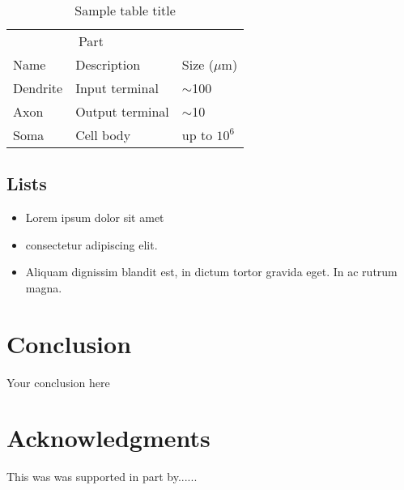 \documentclass{article}
\begin{document}
\begin{table}
 \caption{Sample table title}
  \centering
  \begin{tabular}{lll}
    \toprule
    \multicolumn{2}{c}{Part}                   \\
    \cmidrule(r){1-2}
    Name     & Description     & Size ($\mu$m) \\
    \midrule
    Dendrite & Input terminal  & $\sim$100     \\
    Axon     & Output terminal & $\sim$10      \\
    Soma     & Cell body       & up to $10^6$  \\
    \bottomrule
  \end{tabular}
  \label{tab:table}
\end{table}

\subsection{Lists}
\begin{itemize}
\item Lorem ipsum dolor sit amet
\item consectetur adipiscing elit. 
\item Aliquam dignissim blandit est, in dictum tortor gravida eget. In ac rutrum magna.
\end{itemize}


\section{Conclusion}
Your conclusion here

\section*{Acknowledgments}
This was was supported in part by......
\end{document}

